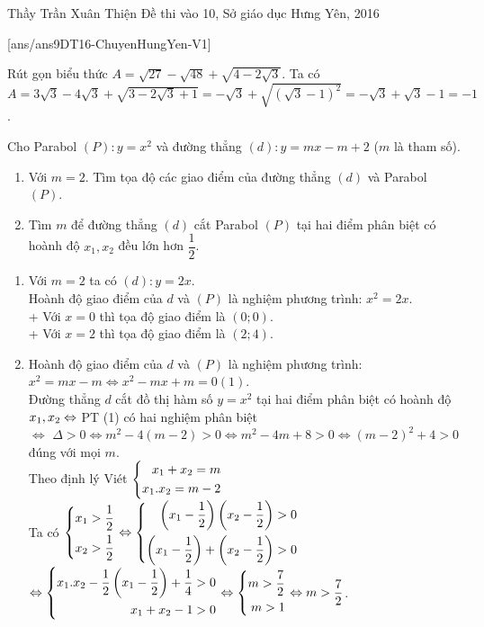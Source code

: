 \begin{name}
{Thầy  Trần Xuân Thiện}
{Đề thi vào 10, Sở giáo dục Hưng Yên, 2016}
\end{name}
\setcounter{ex}{0}
[ans/ans9DT16-ChuyenHungYen-V1]

\begin{ex}%
 Rút gọn biểu thức $A = \sqrt{27} - \sqrt{48} + \sqrt{4 - 2\sqrt{3}}$.
\loigiai
    {
Ta có $A = 3\sqrt{3} - 4\sqrt{3} + \sqrt{3 - 2\sqrt{3}+1} = - \sqrt{3} + \sqrt{(\sqrt{3}-1)^2} = -\sqrt{3} + \sqrt{3} - 1 = -1$.
    }
\end{ex}

\begin{ex}%
Cho Parabol $(P): y = x^2$ và đường thẳng $(d): y=mx-m+2$ ($m$ là tham số).
    \begin{enumerate}    
        \item Với $m = 2$. Tìm tọa độ các giao điểm của đường thẳng $(d)$ và Parabol $(P)$.
        \item Tìm $m$ để đường thẳng $(d)$ cắt Parabol $(P)$ tại hai điểm phân biệt có hoành độ $x_1, x_2$ đều lớn hơn $\dfrac{1}{2}$.
    \end{enumerate}
\loigiai
    {
    \begin{enumerate}
        \item Với $m = 2$ ta có $(d): y=2x$.\\
		Hoành độ giao điểm của $d$ và $(P)$ là nghiệm phương trình: $x^2=2x$. \\
+ Với $x=0$ thì tọa độ giao điểm là $(0;0)$.\\
+ Với $x=2$ thì tọa độ giao điểm là $(2;4)$.
        \item Hoành độ giao điểm của $d$ và $(P)$ là nghiệm phương trình:\\
 $x^2=mx-m \Leftrightarrow x^2-mx+m=0 (1)$. \\
        Đường thẳng $d$ cắt đồ thị hàm số $y=x^2$ tại hai điểm phân biệt có hoành độ $x_1, x_2 \\
\Leftrightarrow$ PT (1) có hai nghiệm phân biệt \\
$\Leftrightarrow$ $\Delta >0 \Leftrightarrow m^2-4(m-2)>0 \Leftrightarrow m^2-4m+8>0 \Leftrightarrow (m-2)^2+4>0$ đúng với mọi $m$.\\
Theo định lý Viét $\left\{\begin{aligned}x_1+x_2=m\\ x_1.x_2=m-2\end{aligned}\right.$\\
Ta có $\left\{\begin{aligned}x_1>\dfrac{1}{2}\\ x_2>\dfrac{1}{2}\end{aligned}\right. \Leftrightarrow \left\{\begin{aligned}\left( {{x_1} - \frac{1}{2}} \right)\left( {{x_2} - \frac{1}{2}} \right) > 0
\\ \left( {{x_1} - \frac{1}{2}} \right)+\left( {{x_2} - \frac{1}{2}} \right) > 0\end{aligned}\right.$\\
$\Leftrightarrow \left\{\begin{aligned}x_1.x_2-\dfrac{1}{2}\left( {{x_1} - \frac{1}{2}} \right)+\dfrac{1}{4}>0\\ x_1+x_2-1>0\end{aligned}\right. \Leftrightarrow \left\{\begin{aligned}m>\dfrac{7}{2}\\ m>1\end{aligned}\right. \Leftrightarrow m>\dfrac{7}{2}$.
    \end{enumerate}
    }
\end{ex}

